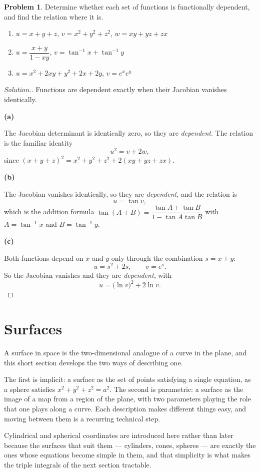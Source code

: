 \documentclass[11pt,a4paper]{article}
\theoremstyle{definition}
\newtheorem{problemx}{Problem}[subsection]
\newenvironment{problem}{\begin{problemx}}{\end{problemx}}
\newenvironment{solution}
  {\renewcommand{\qedsymbol}{}\begin{proof}[\textit{Solution}.]}
  {\end{proof}}
\newcommand{\subhead}[1]{%
  \par\medskip\noindent\textbf{#1}\par\nobreak\smallskip}
\begin{document}
\begin{problem}
Determine whether each set of functions is functionally dependent, and find the
relation where it is.
\begin{enumerate}
\item[(a)] $u = x+y+z$, $v = x^2+y^2+z^2$, $w = xy+yz+zx$
\item[(b)] $u = \dfrac{x+y}{1-xy}$, $v = \tan^{-1}x + \tan^{-1}y$
\item[(c)] $u = x^2+2xy+y^2+2x+2y$, $v = e^xe^y$
\end{enumerate}
\end{problem}
\begin{solution}
Functions are dependent exactly when their Jacobian vanishes identically.

\subhead{(a)}
The Jacobian determinant is identically zero, so they are \emph{dependent}. The
relation is the familiar identity
$$u^2 = v + 2w ,$$
since $(x+y+z)^2 = x^2+y^2+z^2 + 2(xy+yz+zx)$.

\subhead{(b)}
The Jacobian vanishes identically, so they are \emph{dependent}, and the
relation is
$$u = \tan v ,$$
which is the addition formula
$\tan(A+B) = \dfrac{\tan A+\tan B}{1-\tan A\tan B}$ with
$A = \tan^{-1}x$ and $B = \tan^{-1}y$.

\subhead{(c)}
Both functions depend on $x$ and $y$ only through the combination $s = x+y$:
$$u = s^2+2s,\qquad v = e^{s}.$$
So the Jacobian vanishes and they are \emph{dependent}, with
$$u = \big(\ln v\big)^2 + 2\ln v .$$
\end{solution}


{\color[wave]{485}\section{Surfaces}}

A surface in space is the two-dimensional analogue of a curve in the plane, and
this short section develops the two ways of describing one.

The first is implicit: a surface as the set of points satisfying a single
equation, as a sphere satisfies $x^2+y^2+z^2 = a^2$. The second is parametric:
a surface as the image of a map from a region of the plane, with two parameters
playing the role that one plays along a curve. Each description makes different
things easy, and moving between them is a recurring technical step.

Cylindrical and spherical coordinates are introduced here rather than later
because the surfaces that suit them --- cylinders, cones, spheres --- are exactly
the ones whose equations become simple in them, and that simplicity is what makes
the triple integrals of the next section tractable.
\end{document}
